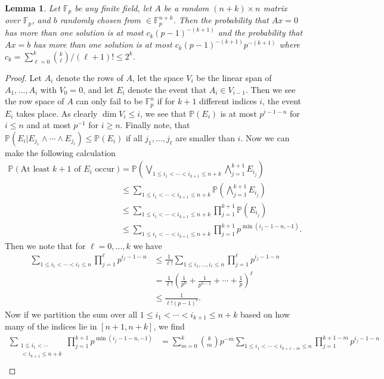 \documentclass[12pt]{article}
\renewcommand{\P}{\mathbb{P}}
\newcommand{\F}{\mathbb{F}}
\theoremstyle{plain}
\newtheorem{lem}[thm]{Lemma} %
\theoremstyle{definition}
\theoremstyle{remark}
\begin{document}
\begin{lem}
\label{lem:probindep}
Let $\F_p$ be any finite field, let $A$ be a random $(n+k)\times n$ matrix over $\F_p$, and $b$ randomly chosen from $\in \F_p^{n+k}$. Then the probability that $Ax=0$ has more than one solution is at most $c_k (p-1)^{-(k+1)}$ and the probability that $Ax=b$ has more than one solution is at most $c_k (p-1)^{-(k+1)} p^{-(k+1)}$ where $c_k = \sum_{\ell = 0}^k \binom{k}{\ell}/(\ell+1)! \leq 2^k$.
\end{lem}
\begin{proof}
Let $A_i$ denote the rows of $A$, let the space $V_i$ be the linear span of $A_1,\dots,A_i$ with $V_0 = 0$, and let $E_i$ denote the event that $A_i \in V_{i-1}$. Then we see the row space of $A$ can only fail to be $\F_p^n$ if for $k+1$ different indices $i$, the event $E_i$ takes place. As clearly $\dim V_i \leq i$, we see that $\P(E_i)$ is at most $p^{i-1-n}$ for $i \leq n$ and at most $p^{-1}$ for $i \geq n$. Finally note, that $\P(E_i | E_{j_1} \wedge \cdots \wedge E_{j_\ell}) \leq \P(E_i)$ if all $j_1,\dots,j_\ell$ are smaller than $i$. Now we can make the following calculation
\begin{align*}
\P(\text{At least } k+1 \text{ of } E_i \text{ occur}) &= \P\left(\bigvee_{1\leq i_1 < \cdots < i_{k+1} \leq n + k} \bigwedge_{j=1}^{k+1} E_{i_j} \right) \\
&\leq \sum_{1\leq i_1 < \cdots < i_{k+1} \leq n + k} \P\left(\bigwedge_{j=1}^{k+1} E_{i_j}\right) \\
&\leq \sum_{1\leq i_1 < \cdots < i_{k+1} \leq n + k} \prod_{j=1}^{k+1} \P(E_{i_j}) \\
&\leq \sum_{1\leq i_1 < \cdots < i_{k+1} \leq n + k} \prod_{j=1}^{k+1} p^{{\min(i_j-1-n,-1)}}.
\end{align*}
Then we note that for $\ell = 0,\dots,k$ we have
\begin{align*}
\sum_{1\leq i_1 < \cdots < i_{\ell} \leq n}\prod_{j=1}^{\ell} p^{i_j-1-n} &\leq \frac{1}{\ell!} \sum_{1\leq i_1,\dots,i_{\ell} \leq n} \prod_{j=1}^{\ell} p^{i_j-1-n} \\
&= \frac{1}{\ell!} (\frac{1}{p^n} + \frac{1}{p^{n-1}} + \cdots + \frac{1}{p})^\ell\\
&\leq \frac{1}{\ell! (p-1)^\ell}.
\end{align*}
Now if we partition the sum over all $1\leq i_1 < \cdots < i_{k+1} \leq n + k$ based on how many of the indices lie in $[n+1,n+k]$, we find
\begin{align*}
\sum_{\substack{1\leq i_1 < \cdots \\ < i_{k+1} \leq n + k}} \prod_{j=1}^{k+1} p^{{\min(i_j-1-n,-1)}} &= \sum_{m = 0}^{k} \binom{k}{m}p^{-m}\sum_{1\leq i_1 < \cdots < i_{k+1-m} \leq n}\prod_{j=1}^{k+1-m} p^{i_j-1-n}\\

\end{align*}
\end{proof}
\end{document}

